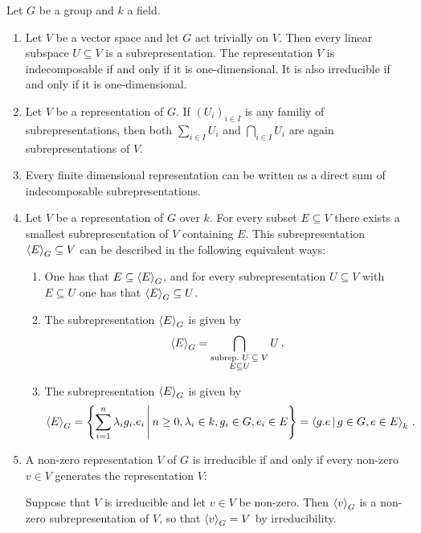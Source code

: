 \begin{example}
  Let $G$ be a group and $k$ a field.
  \begin{enumerate}
    \item
      Let $V$ be a vector space and let $G$ act trivially on $V$.
      Then every linear subspace $U \subseteq V$ is a subrepresentation.
      The representation $V$ is indecomposable if and only if it is one-dimensional.
      It is also irreducible if and only if it is one-dimensional.
    \item
      Let $V$ be a representation of $G$.
      If $(U_i)_{i \in I}$ is any familiy of subrepresentations, then both $\sum_{i \in I} U_i$ and $\bigcap_{i \in I} U_i$ are again subrepresentations of $V$.
    \item
      Every finite dimensional representation can be written as a direct sum of indecomposable subrepresentations.
    \item
      Let $V$ be a representation of $G$ over $k$.
      For every subset $E \subseteq V$ there exists a smallest subrepresentation of $V$ containing $E$.
      This subrepresentation $\left\langle E \right\rangle_G \subseteq V$ can be described in the following equivalent ways:
      \begin{enumerate}
        \item
          One has that $E \subseteq \left\langle E \right\rangle_G$, and for every subrepresentation $U \subseteq V$ with $E \subseteq U$ one has that $\left\langle E \right\rangle_G \subseteq U$.
        \item
          The subrepresentation $\left\langle E \right\rangle_G$ is given by
          \[
              \left\langle E \right\rangle_G
            = \bigcap_{\substack{\text{subrep.\ $U \subseteq V$} \\ E \subseteq U}} U \,.
          \]
        \item
          The subrepresentation $\left\langle E \right\rangle_G$ is given by
          \[
              \gen{E}_G
            = \left\{
                \sum_{i=1}^n \lambda_i g_i.e_i
              \suchthat*
                n \geq 0,
                \lambda_i \in k,
                g_i \in G,
                e_i \in E
              \right\}
            = \gen{g.e \suchthat g \in G, e \in E}_k \,.
          \]
      \end{enumerate}
    \item
      A non-zero representation $V$ of $G$ is irreducible if and only if every non-zero $v \in V$ generates the representation $V$:
      
      Suppose that $V$ is irreducible and let $v \in V$ be non-zero.
      Then $\left\langle v \right\rangle_G$ is a non-zero subrepresentation of $V$, so that $\left\langle v \right\rangle_G = V$ by irreducibility.
      

\end{enumerate}
\end{example}
